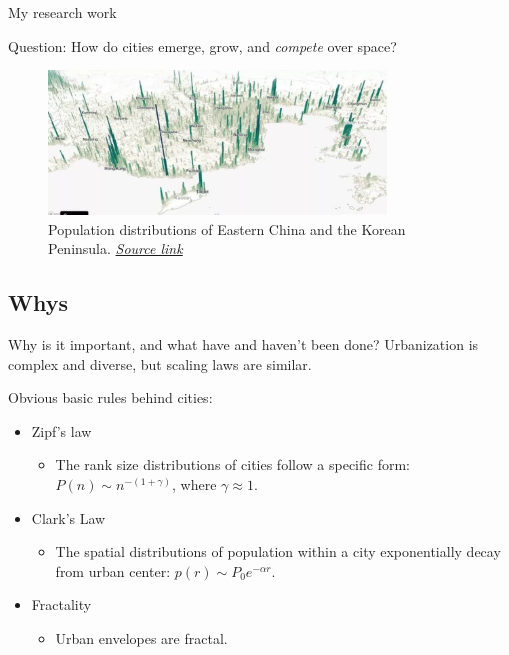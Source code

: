 \begin{frame}{My research work}

Question: How do cities emerge, grow, and \textit{compete} over space?
\begin{figure}
    \centering
    \includegraphics[width = 0.8\textwidth]{Pics/Population_hight_real.jpeg}
    \caption{Population distributions of Eastern China and the Korean Peninsula. \href{https://new.qq.com/rain/a/20190129A06G9C}{\textit{Source link}}}
    \label{fig:pop_real}
\end{figure}
\end{frame}

\subsection{Whys}
\begin{frame}{Why is it important, and what have and haven't been done?}
    Urbanization is complex and diverse, but scaling laws are similar.
    \vspace{0.5cm}
    
    Obvious basic rules behind cities:
    \begin{itemize}
        \item Zipf's law
        \begin{itemize}
            \item The rank size distributions of cities follow a specific form:$P(n) \sim n^{-(1+\gamma)}$, where $\gamma\approx 1$.
        \end{itemize}
        \item Clark's Law
        \begin{itemize}
            \item The spatial distributions of population within a city exponentially decay from urban center: $p(r) \sim P_0e^{-\alpha r}$.
        \end{itemize}
        \item Fractality
        \begin{itemize}
            \item Urban envelopes are fractal.
        \end{itemize}
    \end{itemize}
    
    \begin{center}
    \end{center}
\end{frame}

